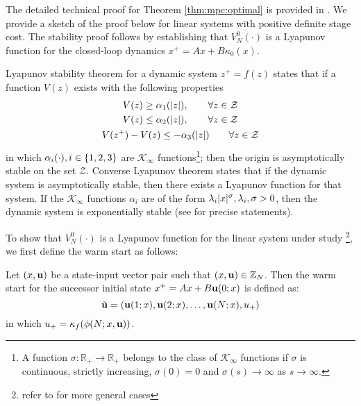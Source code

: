 The detailed technical proof for Theorem \ref{thm:mpc:optimal} is
provided in \citet[Chap. 2]{rawlings:mayne:2009}. We provide a sketch
of the proof below for linear systems with positive definite stage
cost. The stability proof follows by establishing that 
$V_N^0(\cdot)$ is a 
Lyapunov function for the closed-loop dynamics $x^+=Ax +
B\kappa_0(x)$. 

Lyapunov stability theorem for a dynamic system
$z^+=f(z)$ states that if a function $V(z)$ exists with the following
properties
\begin{gather}
V(z) \geq \alpha_1(\vert z \vert), \qquad \forall z \in \mathcal{Z} \label{eq:mpc:lyap:lower-bound} \\
V(z) \leq \alpha_2(\vert z \vert), \qquad \forall z \in \mathcal{Z} \label{eq:mpc:lyap:upper-bound}\\
V(z^+) -V(z) \leq -\alpha_3(\vert z \vert) \qquad \forall z \in \mathcal{Z} \label{eq:mpc:lyap:cost-drop}
\end{gather}
in which $\alpha_i(\cdot), i \in \left\lbrace 1,2,3 \right\rbrace$ are
$\mathcal{K}_{\infty}$ functions\footnote{A function $\sigma: \mathbb{R}_+
  \rightarrow \mathbb{R}_+$ belongs to the class of
  $\mathcal{K}_{\infty}$ functions if $\sigma$ is continuous, strictly
increasing, $\sigma(0) = 0$ and $\sigma(s) \rightarrow \infty$ as $s
\rightarrow \infty$.}; then the origin is asymptotically
stable on the set $\mathcal{Z}$. Converse Lyapunov theorem states that if the dynamic system is
asymptotically stable, then there exists a Lyapunov function for that
system. If the $\mathcal{K}_{\infty}$ functions $\alpha_i$  are of the
form $\lambda_i \vert x \vert^\sigma, \lambda_i,\sigma >0$, then the dynamic
system is exponentially stable (see \citet[Appendix B.]{rawlings:mayne:2009} for precise
statements).

To show that $V_N^0(\cdot)$ is a Lyapunov function for the linear
system under study \footnote{refer to \citet[Chap
  2.]{rawlings:mayne:2009} for more general cases}, we first define
the warm start as follows:
\begin{definition}
\label{def:mpc:warmstart}
Let $(x,\mathbf{u})$ be a state-input vector pair such that $(x,\mathbf{u}) \in
\mathbb{Z}_N$. Then the warm start for the successor initial state
$x^+ = Ax+B\mathbf{u}(0;x)$ is defined as:
\begin{equation*}
\tilde{\mathbf{u}} = \left (\mathbf{u}(1;x),\mathbf{u}(2;x),\ldots,\mathbf{u}(N;x),u_+\right)
\end{equation*}
in which  $u_+ = \kappa_f(\phi(N;x,\mathbf{u}))$.
\end{definition}

